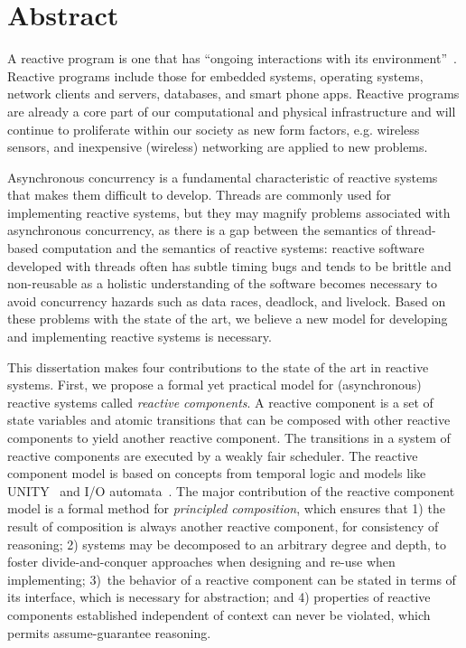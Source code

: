 \chapter*{Abstract}

A reactive program is one that has ``ongoing interactions with its environment''~\cite{manna1992temporal}.
Reactive programs include those for embedded systems, operating systems, network clients and servers, databases, and smart phone apps.
Reactive programs are already a core part of our computational and physical infrastructure and will continue to proliferate within our society as new form factors, e.g. wireless sensors, and inexpensive (wireless) networking are applied to new problems.

Asynchronous concurrency is a fundamental characteristic of reactive systems that makes them difficult to develop.
Threads are commonly used for implementing reactive systems, but they may magnify problems associated with asynchronous concurrency, as there is a gap between the semantics of thread-based computation and the semantics of reactive systems:  reactive software developed with threads often has subtle timing bugs and tends to be brittle and non-reusable as a holistic understanding of the software becomes necessary to avoid concurrency hazards such as data races, deadlock, and livelock.
Based on these problems with the state of the art, we believe a new model for developing and implementing reactive systems is necessary.

This dissertation makes four contributions to the state of the art in reactive systems.
First, we propose a formal yet practical model for (asynchronous) reactive systems called \emph{reactive components}.
A reactive component is a set of state variables and atomic transitions that can be composed with other reactive components to yield another reactive component.
The transitions in a system of reactive components are executed by a weakly fair scheduler.
The reactive component model is based on concepts from temporal logic and models like UNITY~\cite{chandy1989parallel} and I/O automata~\cite{nancy1996distributed}.
The major contribution of the reactive component model is a formal method for \emph{principled composition}, which ensures that 1) the result of composition is always another reactive component, for consistency of reasoning; 2) systems may be decomposed to an arbitrary degree and depth, to foster divide-and-conquer approaches when designing and re-use when implementing; 3)~the behavior of a reactive component can be stated in terms of its interface, which is necessary for abstraction; and 4) properties of reactive components established independent of context can never be violated, which permits assume-guarantee reasoning.

